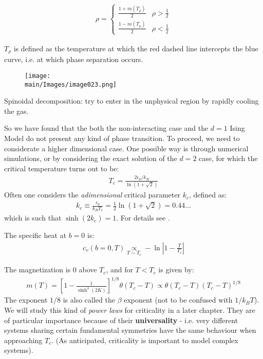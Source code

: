 \documentclass[../../main.tex]{subfiles}
\begin{document}
\begin{align*}
    \rho = \begin{cases}
        \frac{1+m(T_\rho)}{2} & \rho > \frac{1}{2}\\
        \frac{1-m(T_\rho)}{2} & \rho < \frac{1}{2}    
    \end{cases}
\end{align*}

$T_\rho$ is defined as the temperature at which the red dashed line intercepts the blue curve, i.e. at which phase separation occurs. 



\begin{figure}[H]
    \centering
    \texttt{[image: \\main/Images/image023.png]}
    \caption{\label{fig:fluid-phases}}
\end{figure}

Spinoidal decomposition: try to enter in the unphysical region by rapidly cooling the gas. 


\medskip

So we have found that the both the non-interacting case and the $d=1$ Ising Model do not present any kind of phase transition. To proceed, we need to considerate a higher dimensional case. One possible way is through numerical simulations, or by considering the exact solution of the $d=2$ case, for which the critical temperature turns out to be:
\begin{align*}
    T_c = \frac{2 \epsilon_0 / k_B}{\ln (1 + \sqrt{2})} 
\end{align*}
Often one considers the \textit{adimensional} critical parameter $k_c$, defined as:
\begin{align*}
    k_c \equiv \frac{\epsilon_0}{k_B T_c} = \frac{1}{2} \ln (1 + \sqrt{2}) = 0.44\dots  
\end{align*} 
which is such that $\sinh(2k_c) = 1$. %
For details see \cite{huang}. 

The specific heat at $b=0$ is:
\begin{align*}
    c_v(b=0, T) \underset{T \sim T_c}{\propto} - \ln \left|1-\frac{T}{T_c}  \right|
\end{align*}

The magnetization is $0$ above $T_c$, and for $T < T_c$ is given by:
\begin{align*}
    m(T) = \left[1-\frac{1}{\sinh^4(2K)} \right]^{1/8} \theta(T_c-T) \propto \theta(T_c - T) (T_c - T)^{1/8}
\end{align*}
The exponent $1/8$ is also called the $\beta$ exponent (not to be confused with $1/k_B T$). We will study this kind of \textit{power laws} for criticality in a later chapter. They are of particular importance because of their \textbf{universality} - i.e. very different systems sharing certain fundamental symmetries have the same behaviour when approaching $T_c$. (As anticipated, criticality is important to model complex systems). 
\end{document}
